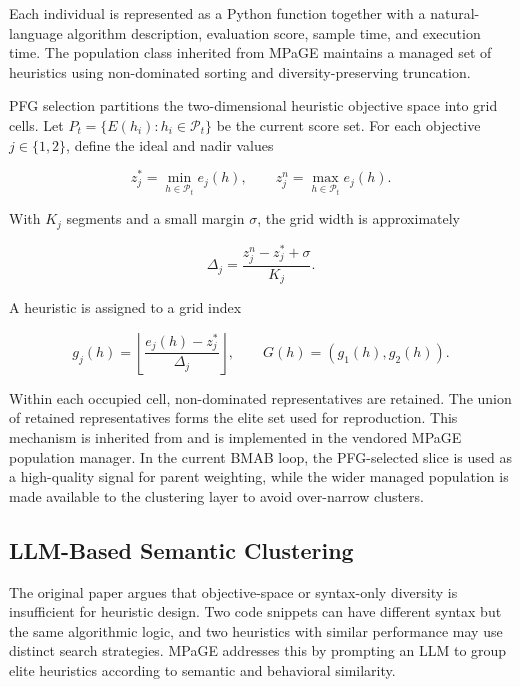 Each individual is represented as a Python function together with a natural-language algorithm description, evaluation score, sample time, and execution time. The population class inherited from MPaGE maintains a managed set of heuristics using non-dominated sorting and diversity-preserving truncation.

PFG selection partitions the two-dimensional heuristic objective space into grid cells. Let $P_t = \{E(h_i): h_i \in \mathcal{P}_t\}$ be the current score set. For each objective $j \in \{1,2\}$, define the ideal and nadir values

\begin{equation}
  z_j^{\ast} = \min_{h \in \mathcal{P}_t} e_j(h), \qquad
  z_j^{n} = \max_{h \in \mathcal{P}_t} e_j(h).
\end{equation}

With $K_j$ segments and a small margin $\sigma$, the grid width is approximately

\begin{equation}
  \Delta_j = \frac{z_j^{n} - z_j^{\ast} + \sigma}{K_j}.
\end{equation}

A heuristic is assigned to a grid index

\begin{equation}
  g_j(h)=\left\lfloor \frac{e_j(h)-z_j^{\ast}}{\Delta_j}\right\rfloor,
  \qquad
  G(h)=(g_1(h),g_2(h)).
\end{equation}

Within each occupied cell, non-dominated representatives are retained. The union of retained representatives forms the elite set used for reproduction. This mechanism is inherited from \mpage{} and is implemented in the vendored MPaGE population manager. In the current BMAB loop, the PFG-selected slice is used as a high-quality signal for parent weighting, while the wider managed population is made available to the clustering layer to avoid over-narrow clusters.

\subsection{LLM-Based Semantic Clustering}

The original \mpage{} paper argues that objective-space or syntax-only diversity is insufficient for heuristic design. Two code snippets can have different syntax but the same algorithmic logic, and two heuristics with similar performance may use distinct search strategies. MPaGE addresses this by prompting an LLM to group elite heuristics according to semantic and behavioral similarity.

